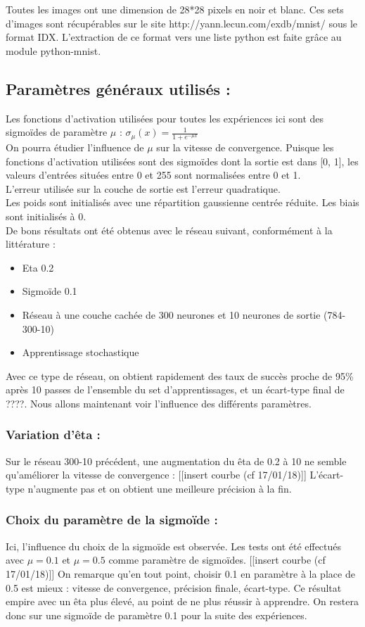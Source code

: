 Toutes les images ont une dimension de 28*28 pixels en noir et blanc. Ces sets d’images sont récupérables sur le site http://yann.lecun.com/exdb/mnist/ sous le format IDX. L’extraction de ce format vers une liste python est faite grâce au module python-mnist.

\subsection*{Paramètres généraux utilisés :} %
Les fonctions d’activation utilisées pour toutes les expériences ici sont des sigmoïdes de paramètre $\mu$ : 
$\sigma_\mu(x) = \frac{1}{1+e^{-\mu x}}$\\
On pourra étudier l’influence de $\mu$ sur la vitesse de convergence.
Puisque les fonctions d’activation utilisées sont des sigmoïdes dont la sortie est dans [0, 1], les valeurs d’entrées situées entre 0 et 255 sont normalisées entre 0 et 1.\\
L’erreur utilisée sur la couche de sortie est l’erreur quadratique.\\
Les poids sont initialisés avec une répartition gaussienne centrée réduite. Les biais sont initialisés à 0.\\
De bons résultats ont été obtenus avec le réseau suivant, conformément à la littérature :
\begin{itemize}
	\item Eta 0.2
	\item Sigmoïde 0.1
	\item Réseau à une couche cachée de 300 neurones et 10 neurones de sortie (784-300-10)
	\item Apprentissage stochastique
\end{itemize}
Avec ce type de réseau, on obtient rapidement des taux de succès proche de 95\% après 10 passes de l’ensemble du set d’apprentissages, et un écart-type final de ????. Nous allons maintenant voir l’influence des différents paramètres.

\subsubsection*{Variation d’êta :}


Sur le réseau 300-10 précédent, une augmentation du êta de 0.2 à 10 ne semble qu’améliorer la vitesse de convergence : [[insert courbe (cf 17/01/18)]]
L’écart-type n’augmente pas et on obtient une meilleure précision à la fin.

\subsubsection*{Choix du paramètre de la sigmoïde :}
Ici, l’influence du choix de la sigmoïde est observée. Les tests ont été effectués avec $\mu = 0.1$ et $\mu = 0.5$ comme paramètre de sigmoïdes.
[[insert courbe (cf 17/01/18)]]
On remarque qu’en tout point, choisir 0.1 en paramètre à la place de 0.5 est mieux : vitesse de convergence, précision finale, écart-type. Ce résultat empire avec un êta plus élevé, au point de ne plus réussir à apprendre. On restera donc sur une sigmoïde de paramètre 0.1 pour la suite des expériences.

